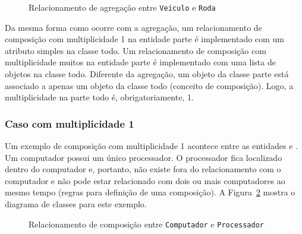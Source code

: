 \begin{figure}[h]
	\centering
	
	
	\caption{Relacionamento de agregação entre \texttt{Veiculo} e \texttt{Roda}}
	\label{fig:composicao-veiculo-roda}
\end{figure}
 
Da mesma forma como ocorre com a agregação, um relacionamento de composição com multiplicidade 1 na entidade parte é implementado com um atributo simples na classe todo. Um relacionamento de composição com multiplicidade muitos na entidade parte é implementado com uma lista de objetos na classe todo. Diferente da agregação, um objeto da classe parte está associado a apenas um objeto da classe todo (conceito de composição). Logo, a multiplicidade na parte todo é, obrigatoriamente, 1.

\subsubsection{Caso com multiplicidade 1}

Um exemplo de composição com multiplicidade 1 acontece entre as entidades  e . Um computador possui um único processador. O processador fica localizado dentro do computador e, portanto, não existe fora do relacionamento com o computador e não pode estar relacionado com dois ou mais computadores ao mesmo tempo (regras para definição de uma composição). A Figura~\ref{fig:composicao-computador-processador} mostra o diagrama de classes para este exemplo.

\begin{figure}[h]
	\centering
	
	
	\caption{Relacionamento de composição entre \texttt{Computador} e \texttt{Processador}}
	\label{fig:composicao-computador-processador}
\end{figure}

